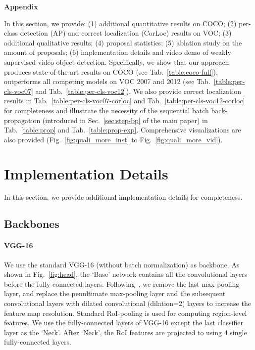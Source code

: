 \documentclass[10pt,twocolumn,letterpaper]{article}
\begin{document}
\appendix
{\centering \Large \textbf{Appendix}}
\vspace{1em}

In this section, we provide:  (1) additional quantitative results on COCO; (2) per-class detection (AP) and correct localization (CorLoc) results on VOC; (3) additional qualitative results; (4) proposal statistics; (5) ablation study on the amount of proposals;  (6) implementation details and video demo of weakly supervised video object detection. Specifically, we show that our approach produces state-of-the-art results on COCO (see Tab.~\ref{table:coco-full}), outperforms all competing models on VOC 2007 and 2012 (see Tab.~\ref{table:per-cls-voc07} and Tab.~\ref{table:per-cls-voc12}). We also provide correct localization results in Tab.~\ref{table:per-cls-voc07-corloc} and Tab.~\ref{table:per-cls-voc12-corloc} for completeness and illustrate the necessity of the sequential batch back-propagation (introduced in  Sec.~\ref{sec:step-bp} of the main paper) in Tab.~\ref{table:prop} and Tab.~\ref{table:prop-exp}. Comprehensive visualizations are also  provided (Fig.~\ref{fig:quali_more_inst} to Fig.~\ref{fig:quali_more_vid}).

\section{Implementation Details}
\label{app:implement}
In this section, we provide additional implementation details for completeness. 
\subsection{Backbones}
\paragraph{VGG-16} We use the standard VGG-16 (without batch normalization) as backbone.
As shown in Fig.~\ref{fig:head}, the `Base' network contains all the convolutional layers before the fully-connected layers. Following~\cite{tang2017multiple}, we remove the last max-pooling layer, and replace the penultimate max-pooling layer and the subsequent convolutional layers with dilated convolutional (dilation=2) layers to increase the feature map  resolution. Standard RoI-pooling is used for computing region-level features. We use the fully-connected layers of VGG-16 except the last classifier layer as the `Neck'. After `Neck', the RoI features are projected to  using 4 single fully-connected layers. 
\end{document}
